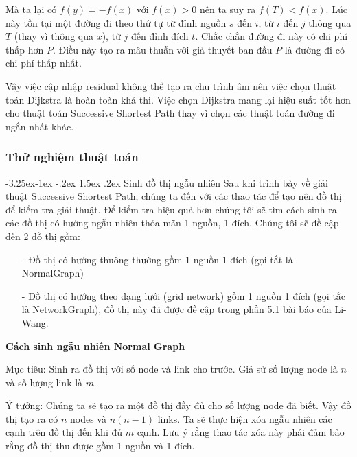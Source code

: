 \documentclass[a4paper]{article}
\makeatletter
\newcounter {subsubsubsection}[subsubsection]
\newcommand\subsubsubsection{\@startsection{subsubsubsection}{4}{\z@}%
                                     {-3.25ex\@plus -1ex \@minus -.2ex}%
                                     {1.5ex \@plus .2ex}%
                                     {\normalfont\normalsize\bfseries}}
\makeatother
\begin{document}
{Mà ta lại có $f(y) = -f(x)$ với $f(x) > 0$ nên ta suy ra $f(T) < f(x)$. Lúc này tồn tại một đường đi theo thứ tự từ đỉnh nguồn $s$ đến $i$, từ $i$ đến $j$ thông qua $T$ (thay vì thông qua $x$), từ $j$ đến đỉnh đích $t$. Chắc chắn đường đi này có chi phí thấp hơn $P$. Điều này tạo ra mâu thuẫn với giả thuyết ban đầu $P$ là đường đi có chi phí thấp nhất. }

{Vậy việc cập nhập residual không thể tạo ra chu trình âm nên việc chọn thuật toán Dijkstra là hoàn toàn khả thi. Việc chọn Dijkstra mang lại hiệu suất tốt hơn cho thuật toán Successive Shortest Path thay vì chọn các thuật toán đường đi ngắn nhất khác. }
\subsubsection{Thử nghiệm thuật toán}
\subsubsubsection{Sinh đồ thị ngẫu nhiên}
{Sau khi trình bày về giải thuật Successive Shortest Path, chúng ta đến với các thao tác để tạo nên đồ thị để kiểm tra giải thuật. Để kiểm tra hiệu quả hơn chúng tôi sẽ tìm cách sinh ra các đồ thị có hướng ngẫu nhiên thỏa mãn 1 nguồn, 1 đích. Chúng tôi sẽ đề cập đến 2 đồ thị gồm: }
\begin{enumerate}
    \item[-] {Đồ thị có hướng thuông thường gồm 1 nguồn 1 đích (gọi tắt là NormalGraph) }
    \item[-] {Đồ thị có hướng theo dạng lưới (grid network) gồm 1 nguồn 1 đích (gọi tắc là NetworkGraph), đồ thị này đã được đề cập trong phần 5.1 bài báo của Li-Wang. } 
\end{enumerate}
\textbf{Cách sinh ngẫu nhiên Normal Graph}

{Mục tiêu: Sinh ra đồ thị với số node và link cho trước.  Giả sử số lượng node là $n$ và số lượng link là $m$}

{Ý tưởng: Chúng ta sẽ tạo ra một đồ thị đầy đủ cho số lượng node đã biết. Vậy đồ thị tạo ra có $n$ nodes và $n(n-1)$ links. Ta sẽ thực hiện xóa ngẫu nhiên các cạnh trên đồ thị đến khi đủ $m$ cạnh. Lưu ý rằng thao tác xóa này phải đảm bảo rằng đồ thị thu được gồm 1 nguồn và 1 đích. } 
\end{document}

